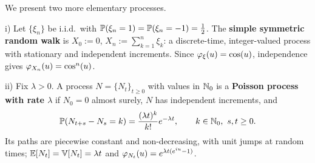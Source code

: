 


We present two more elementary processes.

\begin{example}\label{example:randomwalk}

i) Let $\{\xi_n\}$ be i.i.d.\ with $\mathbb{P}(\xi_n = 1) = \mathbb{P}(\xi_n=-1)=\tfrac12$. The
\textbf{simple symmetric random walk} is $X_0 := 0$, $X_n := \sum_{k=1}^n \xi_k$: a discrete-time,
integer-valued process with stationary and independent increments. Since
$\varphi_\xi(u) = \cos(u)$, independence gives $\varphi_{X_n}(u) = \cos^n(u)$.

ii) Fix $\lambda>0$. A process $N = \{N_t\}_{t\geq0}$ with values in $\mathbb{N}_0$ is a
\textbf{Poisson process with rate $\lambda$} if $N_0 = 0$ almost surely, $N$ has independent
increments, and
\begin{equation}
\mathbb{P}(N_{t+s}-N_s = k) = \frac{(\lambda t)^k}{k!}e^{-\lambda t}, \qquad k \in \mathbb{N}_0,\ s,t\geq0 .
\end{equation}
Its paths are piecewise constant and non-decreasing, with unit jumps at random times;
$\mathbb{E}[N_t] = \mathbb{V}[N_t] = \lambda t$ and
$\varphi_{N_t}(u) = e^{\lambda t(e^{iu}-1)}$.
\end{example}

